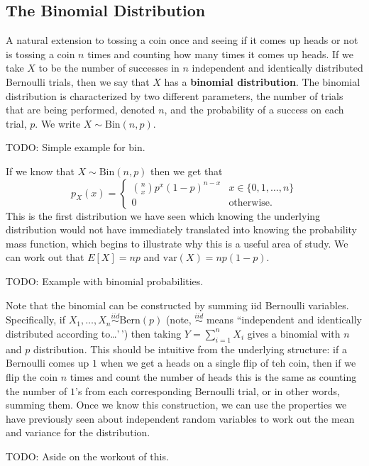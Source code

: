 \documentclass[
  letterpaper,
  DIV=11,
  numbers=noendperiod]{scrreprt}
\begin{document}
\subsection{The Binomial Distribution}\label{the-binomial-distribution}

A natural extension to tossing a coin once and seeing if it comes up
heads or not is tossing a coin \(n\) times and counting how many times
it comes up heads. If we take \(X\) to be the number of successes in
\(n\) independent and identically distributed Bernoulli trials, then we
say that \(X\) has a \textbf{binomial distribution}. The binomial
distribution is characterized by two different parameters, the number of
trials that are being performed, denoted \(n\), and the probability of a
success on each trial, \(p\). We write \(X\sim\text{Bin}(n,p)\).

TODO: Simple example for bin.

If we know that \(X\sim\text{Bin}(n,p)\) then we get that
\[p_X(x) = \begin{cases} \binom{n}{x}p^x(1-p)^{n-x} & x\in\{0,1,\dots,n\} \\ 0 &\text{otherwise}.\end{cases}\]
This is the first distribution we have seen which knowing the underlying
distribution would not have immediately translated into knowing the
probability mass function, which begins to illustrate why this is a
useful area of study. We can work out that \(E[X] = np\) and
\(\text{var}(X) = np(1-p)\).

TODO: Example with binomial probabilities.

Note that the binomial can be constructed by summing iid Bernoulli
variables. Specifically, if
\(X_1,\dots,X_n\stackrel{iid}{\sim}\text{Bern}(p)\) (note,
\(\stackrel{iid}{\sim}\) means ``independent and identically distributed
according to\ldots'\,') then taking \(Y = \sum_{i=1}^n X_i\) gives a
binomial with \(n\) and \(p\) distribution. This should be intuitive
from the underlying structure: if a Bernoulli comes up \(1\) when we get
a heads on a single flip of teh coin, then if we flip the coin \(n\)
times and count the number of heads this is the same as counting the
number of \(1\)'s from each corresponding Bernoulli trial, or in other
words, summing them. Once we know this construction, we can use the
properties we have previously seen about independent random variables to
work out the mean and variance for the distribution.

TODO: Aside on the workout of this.
\end{document}
